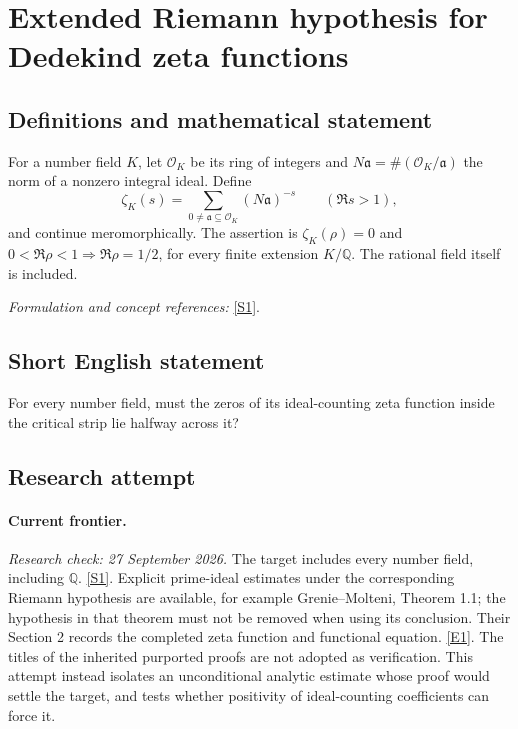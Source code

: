 \documentclass[11pt,a4paper]{article}
\newcommand{\Q}{\mathbb{Q}}
\newcommand{\sref}[2]{\hyperlink{source:#1:#2}{[S#2]}}
\newcommand{\eref}[2]{\hyperlink{extra:#1:#2}{[E#2]}}
\newif\ifshowcatalogue
\newcommand{\cataloguescope}[1]{\ifshowcatalogue
 \paragraph{Exact scope in the supplied catalogue.}
 \begin{quote}\small #1\end{quote}\fi}
\begin{document}
\setcounter{section}{0}
\clearpage
\section*{\texorpdfstring{Extended Riemann hypothesis for Dedekind zeta functions}{Extended Riemann hypothesis for Dedekind zeta functions}}\label{30006677}
\subsection{Definitions and mathematical statement}
For a number field $K$, let $\mathcal O_K$ be its ring of integers and $N\mathfrak a=\#(\mathcal O_K/\mathfrak a)$ the norm of a nonzero integral ideal. Define
\[
 \zeta_K(s)=\sum_{0\ne\mathfrak a\subseteq\mathcal O_K}(N\mathfrak a)^{-s}
 \qquad(\Re s>1),
\]
and continue meromorphically. The assertion is $\zeta_K(\rho)=0$ and $0<\Re\rho<1\Rightarrow\Re\rho=1/2$, for every finite extension $K/\Q$. The rational field itself is included.
\par\smallskip\textit{Formulation and concept references:} \sref{30006677}{1}.
\cataloguescope{For every algebraic number field K (a finite extension of Q, including K=Q), does every zero s of its Dedekind zeta function \ensuremath{\zeta}\_K(s) in the critical strip 0<Re(s)<1 satisfy Re(s)=1/2?}
\subsection{Short English statement}
For every number field, must the zeros of its ideal-counting zeta function inside the critical strip lie halfway across it?
\subsection{Research attempt}
\paragraph{Current frontier.}
\textit{Research check: 27 September 2026.}
The target includes every number field, including $\Q$.
\sref{30006677}{1}. Explicit prime-ideal estimates under the corresponding
Riemann hypothesis are available, for example Grenie--Molteni,
Theorem 1.1; the hypothesis in that theorem must not be removed when
using its conclusion. Their Section 2 records the completed zeta
function and functional equation. \eref{30006677}{1}.
The titles of the inherited purported proofs are not adopted as
verification. This attempt instead isolates an unconditional analytic
estimate whose proof would settle the target, and tests whether
positivity of ideal-counting coefficients can force it.
\end{document}
